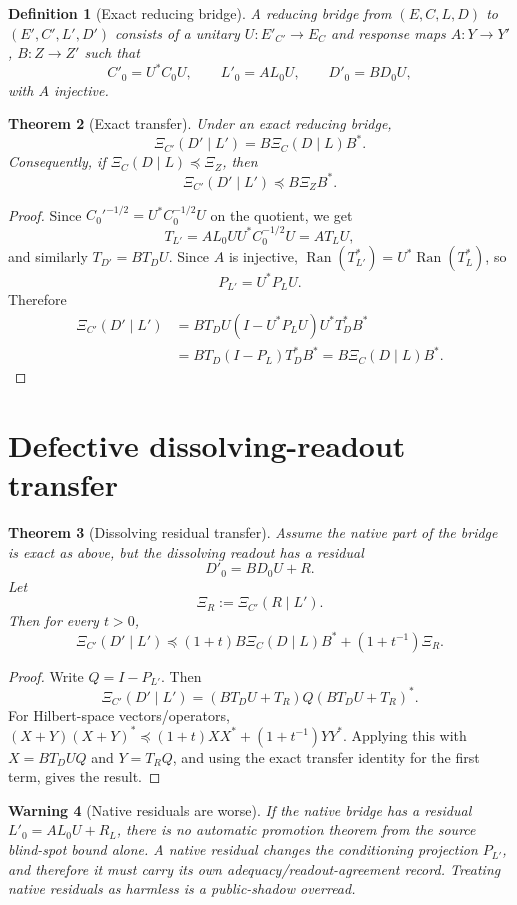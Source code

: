 \documentclass[11pt]{article}
\newtheorem{theorem}{Theorem}[section]
\newtheorem{definition}[theorem]{Definition}
\newtheorem{warning}[theorem]{Warning}
\DeclareMathOperator{\Ran}{Ran}
\newcommand{\pre}{\preceq}
\begin{document}
\begin{definition}[Exact reducing bridge]
A reducing bridge from $(E,C,L,D)$ to $(E',C',L',D')$ consists of a unitary $U:E'_{C'}\to E_C$ and response maps $A:Y\to Y'$, $B:Z\to Z'$ such that
\[
  C'_0=U^*C_0U,
  \qquad
  L'_0=A L_0U,
  \qquad
  D'_0=B D_0U,
\]
with $A$ injective.
\end{definition}

\begin{theorem}[Exact transfer]
Under an exact reducing bridge,
\[
  \boxed{\Xi_{C'}(D'\mid L')=B\Xi_C(D\mid L)B^*.}
\]
Consequently, if $\Xi_C(D\mid L)\pre\Xi_Z$, then
\[
  \Xi_{C'}(D'\mid L')\pre B\Xi_ZB^*.
\]
\end{theorem}

\begin{proof}
Since $C_0'^{-1/2}=U^*C_0^{-1/2}U$ on the quotient, we get
\[
  T_{L'}=AL_0UU^*C_0^{-1/2}U=A T_L U,
\]
and similarly $T_{D'}=B T_DU$.  Since $A$ is injective, $\Ran(T_{L'}^*)=U^*\Ran(T_L^*)$, so
\[
  P_{L'}=U^*P_LU.
\]
Therefore
\[
\begin{aligned}
  \Xi_{C'}(D'\mid L')
  &=B T_DU(I-U^*P_LU)U^*T_D^*B^*\\
  &=B T_D(I-P_L)T_D^*B^*
  =B\Xi_C(D\mid L)B^*.
\end{aligned}
\]
\end{proof}

\section{Defective dissolving-readout transfer}

\begin{theorem}[Dissolving residual transfer]
Assume the native part of the bridge is exact as above, but the dissolving readout has a residual
\[
  D'_0=B D_0U+R.
\]
Let
\[
  \Xi_R:=\Xi_{C'}(R\mid L').
\]
Then for every $t>0$,
\[
  \boxed{
  \Xi_{C'}(D'\mid L')
  \pre
  (1+t)B\Xi_C(D\mid L)B^*+(1+t^{-1})\Xi_R.}
\]
\end{theorem}

\begin{proof}
Write $Q=I-P_{L'}$.  Then
\[
  \Xi_{C'}(D'\mid L')=(BT_DU+T_R)Q(BT_DU+T_R)^*.
\]
For Hilbert-space vectors/operators, $(X+Y)(X+Y)^*\pre(1+t)XX^*+(1+t^{-1})YY^*$.  Applying this with $X=BT_DUQ$ and $Y=T_RQ$, and using the exact transfer identity for the first term, gives the result.
\end{proof}

\begin{warning}[Native residuals are worse]
If the native bridge has a residual $L'_0=AL_0U+R_L$, there is no automatic promotion theorem from the source blind-spot bound alone.  A native residual changes the conditioning projection $P_{L'}$, and therefore it must carry its own adequacy/readout-agreement record.  Treating native residuals as harmless is a public-shadow overread.
\end{warning}
\end{document}
